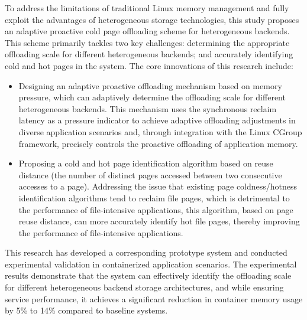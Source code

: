 \begin{englishabstract}
To address the limitations of traditional Linux memory management and fully exploit the advantages of heterogeneous storage technologies, this study proposes an adaptive proactive cold page offloading scheme for heterogeneous backends. This scheme primarily tackles two key challenges: determining the appropriate offloading scale for different heterogeneous backends; and accurately identifying cold and hot pages in the system. The core innovations of this research include:
\begin{itemize}
    \item Designing an adaptive proactive offloading mechanism based on memory pressure, which can adaptively determine the offloading scale for different heterogeneous backends. This mechanism uses the synchronous reclaim latency as a pressure indicator to achieve adaptive offloading adjustments in diverse application scenarios and, through integration with the Linux CGroup framework, precisely controls the proactive offloading of application memory.
    \item Proposing a cold and hot page identification algorithm based on reuse distance (the number of distinct pages accessed between two consecutive accesses to a page). Addressing the issue that existing page coldness/hotness identification algorithms tend to reclaim file pages, which is detrimental to the performance of file-intensive applications, this algorithm, based on page reuse distance, can more accurately identify hot file pages, thereby improving the performance of file-intensive applications.
\end{itemize}

    This research has developed a corresponding prototype system and conducted experimental validation in containerized application scenarios. The experimental results demonstrate that the system can effectively identify the offloading scale for different heterogeneous backend storage architectures, and while ensuring service performance, it achieves a significant reduction in container memory usage by 5\% to 14\% compared to baseline systems.



\end{englishabstract}


